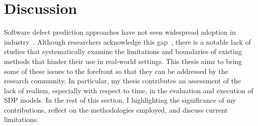 \documentclass[\main/thesis.tex]{subfiles}
\begin{document}
\chapter{Discussion}
\label{chp:discussion}

Software defect prediction approaches have not seen widespread adoption in industry~\cite{grattan2024need}\cite{rana2014framework}. Although researchers acknowledge this gap~\cite{grattan2024need}\cite{kim2025reflection}, there is a notable lack of studies that systematically examine the limitations and boundaries of existing methods that hinder their use in real-world settings. This thesis aims to bring some of these issues to the forefront so that they can be addressed by the research community. In particular, my thesis contributes an assessment of the lack of realism, especially with respect to time, in the evaluation and execution of SDP models. In the rest of this section, I highlighting the significance of my contributions, reflect on the methodologies employed, and discuss current limitations.
\end{document}
